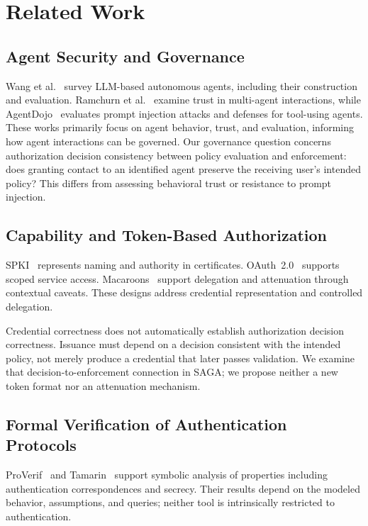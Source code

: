 \section{Related Work}
\label{sec:related-work}

\subsection{Agent Security and Governance}

Wang et al.~\cite{wang2024agents} survey LLM-based autonomous agents,
including their construction and evaluation. Ramchurn et
al.~\cite{ramchurn2004trust} examine trust in multi-agent interactions,
while AgentDojo~\cite{debenedetti2024agentdojo} evaluates prompt injection
attacks and defenses for tool-using agents. These works primarily focus on
agent behavior, trust, and evaluation, informing how agent interactions can
be governed. Our governance question concerns authorization decision
consistency between policy evaluation and enforcement: does granting contact
to an identified agent preserve the receiving user's intended policy?
This differs from assessing behavioral trust or resistance to prompt injection.

\subsection{Capability and Token-Based Authorization}

SPKI~\cite{ellison1999spki} represents naming and authority in certificates.
OAuth~2.0~\cite{hardt2012oauth} supports scoped service access.
Macaroons~\cite{birgisson2014macaroons} support delegation and attenuation
through contextual caveats. These designs address credential representation
and controlled delegation.

Credential correctness does not automatically establish authorization decision
correctness. Issuance must depend on a decision consistent with the intended
policy, not merely produce a credential that later passes validation. We
examine that decision-to-enforcement connection in SAGA; we propose neither
a new token format nor an attenuation mechanism.

\subsection{Formal Verification of Authentication Protocols}

ProVerif~\cite{blanchet2016proverif} and Tamarin~\cite{meier2013tamarin}
support symbolic analysis of properties including authentication correspondences
and secrecy. Their results depend on the modeled behavior, assumptions, and
queries; neither tool is intrinsically restricted to authentication.

